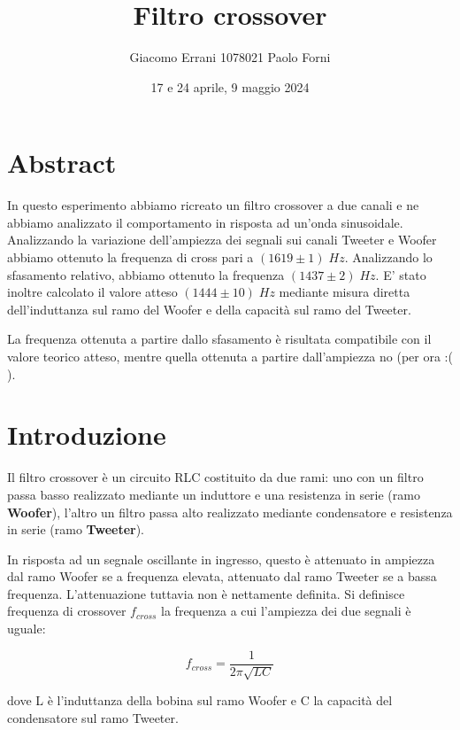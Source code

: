 \documentclass[12pt,a4paper]{article}
\title{Filtro crossover} %
\date{17 e 24 aprile, 9 maggio 2024}
\author{Giacomo Errani 1078021 Paolo Forni}
\begin{document}
\newcommand{\theoryF}{ $(1444 \pm 10) \; Hz $}
\newcommand{\amplitudeF}{$(1619 \pm 1) \; Hz $}
\newcommand{\phaseF}{$(1437 \pm 2) \; Hz $}

\maketitle

\section{Abstract}

\indent In questo esperimento abbiamo ricreato un filtro crossover a due canali e ne abbiamo analizzato il comportamento in risposta ad un'onda sinusoidale. Analizzando la variazione dell'ampiezza dei segnali sui canali Tweeter e Woofer abbiamo ottenuto la frequenza di cross pari a \amplitudeF. Analizzando lo sfasamento relativo, abbiamo ottenuto la frequenza \phaseF. E' stato inoltre calcolato il valore atteso \theoryF \hspace{1pt} mediante misura diretta dell'induttanza sul ramo del Woofer e della capacità sul ramo del Tweeter. 

La frequenza ottenuta a partire dallo sfasamento è risultata compatibile con il valore teorico atteso, mentre quella ottenuta a partire dall'ampiezza no (per ora :( ).

\section{Introduzione}
Il filtro crossover è un circuito RLC costituito da due rami: uno con un filtro passa basso realizzato mediante un induttore e una resistenza in serie (ramo \textbf{Woofer}), l'altro un filtro passa alto realizzato mediante condensatore e resistenza in serie (ramo \textbf{Tweeter}).

In risposta ad un segnale oscillante in ingresso, questo è attenuato in ampiezza dal ramo Woofer se a frequenza elevata, attenuato dal ramo Tweeter se a bassa frequenza. L'attenuazione tuttavia non è nettamente definita. Si definisce frequenza di crossover $f_{cross}$ la frequenza a cui l'ampiezza dei due segnali è uguale:

\begin{equation}
f_{cross} = \frac{1}{2 \pi \sqrt{LC} }
\end{equation}

dove L è l'induttanza della bobina sul ramo Woofer e C la capacità del condensatore sul ramo Tweeter.
\end{document}
